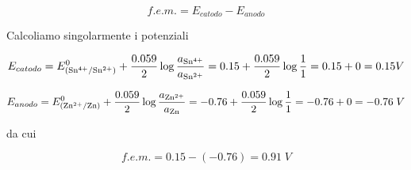 $$f.e.m. = E_{catodo} - E_{anodo}$$

Calcoliamo singolarmente i potenziali

$$E_{catodo}
=E^0_{(\rm Sn^{4+}/Sn^{2+})} + \frac{0.059}{2} \log \frac{a_{\rm Sn^{4+}}}{a_{\rm Sn^{2+}}}
=0.15 + \frac{0.059}{2} \log \frac{1}{1}
=0.15 + 0 = 0.15 V$$

$$E_{anodo} = E^0_{(\rm Zn^{2+}/Zn)} + \frac{0.059}{2} \log \frac{a_{\rm Zn^{2+}}}{a_{\rm Zn}}
=-0.76 + \frac{0.059}{2} \log \frac{1}{1}
= -0.76 + 0=-0.76\;V$$

da cui

$$f.e.m.=0.15 - (-0.76) = 0.91\;V$$